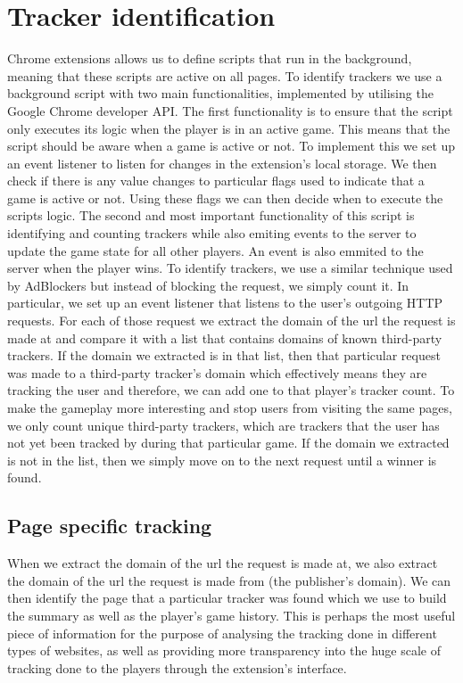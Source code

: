 \documentclass{l4proj}
\begin{document}
\section{Tracker identification}
Chrome extensions allows us to define scripts that run in the background, meaning that these scripts are active on all pages. To identify trackers we use a background script with two main functionalities, implemented by utilising the Google Chrome developer API. The first functionality is to ensure that the script only executes its logic when the player is in an active game. This means that the script should be aware when a game is active or not. To implement this we set up an event listener to listen for changes in the extension's local storage. We then check if there is any value changes to particular flags used to indicate that a game is active or not. Using these flags we can then decide when to execute the scripts logic. The second and most important functionality of this script is identifying and counting trackers while also emiting events to the server to update the game state for all other players. An event is also emmited to the server when the player wins. To identify trackers, we use a similar technique used by AdBlockers but instead of blocking the request, we simply count it. In particular, we set up an event listener that listens to the user's outgoing HTTP requests. For each of those request we extract the domain of the url the request is made at and compare it with a list that contains domains of known third-party trackers. If the domain we extracted is in that list, then that particular request was made to a third-party tracker's domain which effectively means they are tracking the user and therefore, we can add one to that player's tracker count. To make the gameplay more interesting and stop users from visiting the same pages, we only count unique third-party trackers, which are trackers that the user has not yet been tracked by during that particular game. If the domain we extracted is not in the list, then we simply move on to the next request until a winner is found.

\subsection{Page specific tracking}
When we extract the domain of the url the request is made at, we also extract the domain of the url the request is made from (the publisher's domain). We can then identify the page that a particular tracker was found which we use to build the summary as well as the player's game history. This is perhaps the most useful piece of information for the purpose of analysing the tracking done in different types of websites, as well as providing more transparency into the huge scale of tracking done to the players through the extension's interface.
\end{document}
